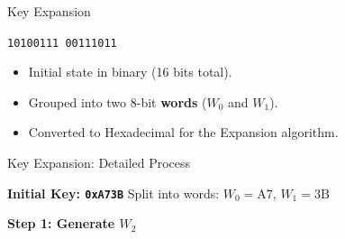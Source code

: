 \documentclass[aspectratio=169,24pt]{beamer}
\begin{document}
\begin{frame}{Key Expansion}
	\begin{wide}
    \centering
    \Large
    \vspace{0.1cm}

    \texttt{10100111  00111011}

    
    

    \vspace{0.5cm}


    \vfill
    \begin{itemize}
        \item<1-> Initial state in binary (16 bits total).
        \item<2-> Grouped into two 8-bit \textbf{words} ($W_0$ and $W_1$).
        \item<3-> Converted to Hexadecimal for the Expansion algorithm.
    \end{itemize}
	\end{wide}
\end{frame}

\begin{frame}{Key Expansion: Detailed Process}
	\begin{wide}
    \begin{block}{\textbf{Initial Key: \texttt{0xA73B}}}
        Split into words: $W_0 = \text{A7}$, $W_1 = \text{3B}$
    \end{block}

    \textbf{Step 1: Generate $W_2$}
            \begin{itemize}
            \end{itemize}
		\end{wide}
\end{frame}
\end{document}
